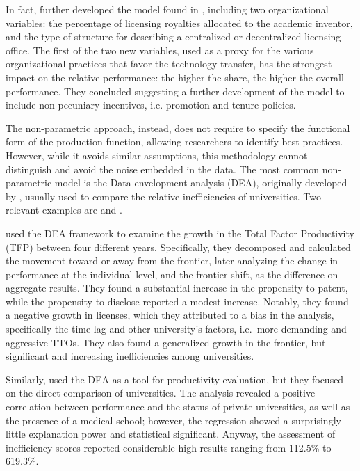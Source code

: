 In fact, \citet{Link2005} further developed the model found in \citet{Siegel2003a}, including two organizational variables: the percentage of licensing royalties allocated to the academic inventor, and the type of structure for describing a centralized or decentralized licensing office. The first of the two new variables, used as a proxy for the various organizational practices that favor the technology transfer, has the strongest impact on the relative performance: the higher the share, the higher the overall performance. They concluded suggesting a further development of the model to include non-pecuniary incentives, i.e. promotion and tenure policies. 

The non-parametric approach, instead, does not require to specify the functional form of the production function, allowing researchers to identify best practices. However, while it avoids similar assumptions, this methodology cannot distinguish and avoid the noise embedded in the data. The most common non-parametric model is the Data envelopment analysis (DEA), originally developed by \citet{Fare1993}, usually used to compare the relative inefficiencies of universities. Two relevant examples are \citet{Thursby2002} and \citet{Anderson2007}.

\citet{Thursby2002} used the DEA framework to examine the growth in the Total Factor Productivity (TFP) between four different years. Specifically, they decomposed and calculated the movement toward or away from the frontier, later analyzing the change in performance at the individual level, and the frontier shift, as the difference on aggregate results. They found a substantial increase in the propensity to patent, while the propensity to disclose reported a modest increase. Notably, they found a negative growth in licenses, which they attributed to a bias in the analysis, specifically the time lag and other university's factors, i.e.\ more demanding and aggressive TTOs. They also found a generalized growth in the frontier, but significant and increasing inefficiencies among universities.

Similarly, \citet{Anderson2007} used the DEA as a tool for productivity evaluation, but they focused on the direct comparison of universities. The analysis revealed a positive correlation between performance and the status of private universities, as well as the presence of a medical school; however, the regression showed a surprisingly little explanation power and statistical significant. Anyway, the assessment of inefficiency scores reported considerable high results ranging from 112.5\% to 619.3\%.

